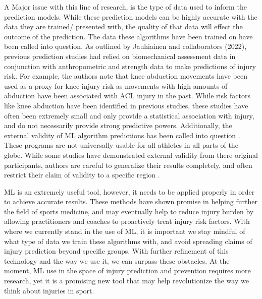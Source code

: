 \documentclass[stu,12pt,floatsintext]{apa7}
\begin{document}
A Major issue with this line of research, is the type of data used to inform the prediction models. While these prediction models can be highly accurate with the data they are trained/ presented with, the quality of that data will effect the outcome of the prediction. The data these algorithms have been trained on have been called into question. As outlined by Jauhiainen and collaborators (2022), previous prediction studies had relied on biomechanical assessment data in conjunction with anthropometric and strength data to make predictions of injury risk. For example, the authors note that knee abduction movements have been used as a proxy for knee injury risk as movements with high amounts of abduction have been associated with ACL injury in the past. While risk factors like knee abduction have been identified in previous studies, these studies have often been extremely small and only provide a statistical association with injury, and do not necessarily provide strong predictive powers\parencite{Jauhiainen_2022}. Additionally, the external validity of ML algorithm predictions has been called into question \parencite{Martin_2022}. These programs are not universally usable for all athletes in all parts of the globe. While some studies have demonstrated external validity from there original participants, authors are careful to generalize their results completely, and often restrict their claim of validity to a specific region \parencite{Martin_2022}.

ML is an extremely useful tool, however, it needs to be applied properly in order to achieve accurate results. These methods have shown promise in helping further the field of sports medicine, and may eventually help to reduce injury burden by allowing practitioners and coaches to proactively treat injury risk factors. With where we currently stand in the use of ML, it is important we stay mindful of what type of data we train these algorithms with, and avoid spreading claims of injury prediction beyond specific groups. With further refinement of this technology and the way we use it, we can surpass these obstacles. At the moment, ML use in the space of injury prediction and prevention requires more research, yet it is a promising new tool that may help revolutionize the way we think about injuries in sport.
\end{document}
